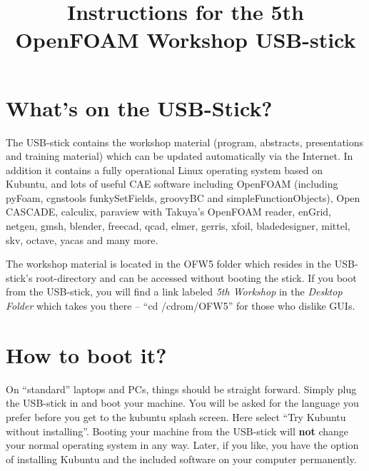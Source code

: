 \documentclass[11pt,a4paper,twocolumn]{article}
\begin{document}
\renewcommand{\enumhook}{\setlength{\topsep}{0pt}%
  \setlength{\itemsep}{0pt}}

\setlength{\columnseprule}{1pt}

\makeatletter
\renewcommand{\@maketitle}{
\newpage
 \null
 \vskip 2em%
 \begin{center}%
  {\LARGE \@title \par}%
 \end{center}%
 \par} \makeatother
\title{Instructions for the 5th OpenFOAM Workshop USB-stick}
\maketitle

\section{What's on the USB-Stick?}

The USB-stick contains the workshop material (program, abstracts, presentations
and training material) which can be updated automatically via the Internet. In
addition it contains a fully operational Linux operating system based on
Kubuntu, and lots of useful CAE software including OpenFOAM (including pyFoam,
cgnstools funkySetFields, groovyBC and simpleFunctionObjects), Open CASCADE,
calculix, paraview with Takuya's OpenFOAM reader, enGrid, netgen, gmsh, blender,
freecad, qcad, elmer, gerris, xfoil, bladedesigner, mittel, skv, octave, yacas
and many more.

The workshop material is located in the OFW5 folder which resides in the
USB-stick's root-directory and can be accessed without booting the stick.  If
you boot from the USB-stick, you will find a link labeled \emph{5th Workshop} in
the \emph{Desktop Folder} which takes you there -- ``cd /cdrom/OFW5'' for those
who dislike GUIs.

\section{How to boot it?}

On ``standard'' laptops and PCs, things should be straight forward. Simply plug
the USB-stick in and boot your machine. You will be asked for the language you
prefer before you get to the kubuntu splash screen. Here select ``Try Kubuntu
without installing''. Booting your machine from the USB-stick will {\bf not}
change your normal operating system in any way. Later, if you like, you have the
option of installing Kubuntu and the included software on your computer
permanently.
\end{document}

